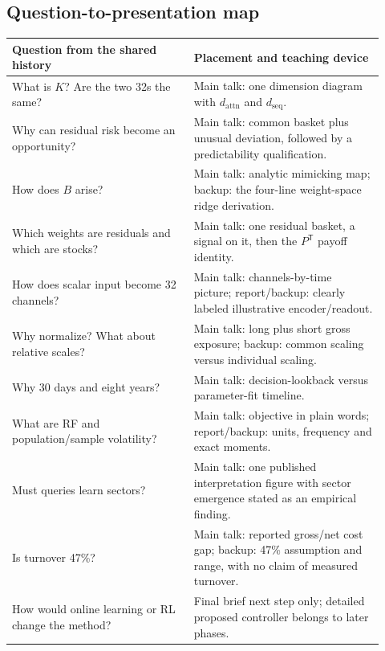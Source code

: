 \documentclass[11pt]{article}
\begin{document}
\subsection{Question-to-presentation map}

\begin{center}
\begin{tabular}{p{0.45\linewidth}p{0.47\linewidth}}
\hline
Question from the shared history & Placement and teaching device \\
\hline
What is $K$? Are the two 32s the same? & Main talk: one dimension
diagram with $d_{\mathrm{attn}}$ and $d_{\mathrm{seq}}$. \\
Why can residual risk become an opportunity? & Main talk: common basket
plus unusual deviation, followed by a predictability qualification. \\
How does $B$ arise? & Main talk: analytic mimicking map; backup: the
four-line weight-space ridge derivation. \\
Which weights are residuals and which are stocks? & Main talk: one
residual basket, a signal on it, then the $P^{\mathsf T}$ payoff identity. \\
How does scalar input become 32 channels? & Main talk: channels-by-time
picture; report/backup: clearly labeled illustrative encoder/readout. \\
Why normalize? What about relative scales? & Main talk: long plus short
gross exposure; backup: common scaling versus individual scaling. \\
Why 30 days and eight years? & Main talk: decision-lookback versus
parameter-fit timeline. \\
What are RF and population/sample volatility? & Main talk: objective
in plain words; report/backup: units, frequency and exact moments. \\
Must queries learn sectors? & Main talk: one published interpretation
figure with sector emergence stated as an empirical finding. \\
Is turnover 47\%? & Main talk: reported gross/net cost gap; backup:
47\% assumption and range, with no claim of measured turnover. \\
How would online learning or RL change the method? & Final brief next
step only; detailed proposed controller belongs to later phases. \\
\hline
\end{tabular}
\end{center}


\end{document}
